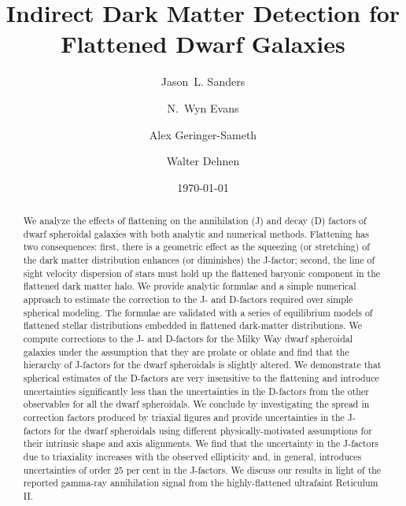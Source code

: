 \documentclass[prd,twocolumn,showpacs,preprintnumbers,superscriptaddress,nofootinbib,amsmath,amssymb,nobalancelastpage]{revtex4}
\def\percent{\text{ per cent}}
\def\percent{\text{ per cent}}
\begin{document}
\title{Indirect Dark Matter Detection for Flattened Dwarf Galaxies}

\author{Jason~L. Sanders}

\author{N.~Wyn Evans}

\author{Alex Geringer-Sameth}

\author{Walter Dehnen}

\date{\today}

\begin{abstract}
We analyze the effects of flattening on the annihilation (J) and decay (D) factors of dwarf spheroidal galaxies with both analytic
and numerical methods. Flattening has two consequences: first, there
is a geometric effect as the squeezing (or stretching) of the dark
matter distribution enhances (or diminishes) the J-factor; second, the
line of sight velocity dispersion of stars must hold up the flattened baryonic
component in the flattened dark matter halo. We provide analytic formulae and a simple numerical approach to estimate the correction to the J- and D-factors required over simple spherical modeling. The formulae are validated with a series of equilibrium models of flattened stellar distributions embedded in flattened dark-matter distributions.
We compute corrections to the J- and D-factors for the Milky Way dwarf spheroidal galaxies under the assumption that they are prolate or oblate and find that the hierarchy of J-factors for the dwarf spheroidals is slightly altered. We demonstrate that spherical estimates of the D-factors are very insensitive to the flattening and introduce uncertainties significantly less than the uncertainties in the D-factors from the other observables for all the dwarf spheroidals. We conclude by investigating the spread in correction factors produced by triaxial figures and provide uncertainties in the J-factors for the dwarf spheroidals using different physically-motivated assumptions for their intrinsic shape and axis alignments. We find that the uncertainty in the J-factors due to triaxiality increases with the observed ellipticity and, in general, introduces uncertainties of order $25\percent$ in the J-factors. We discuss our results in light of the reported gamma-ray annihilation signal from the highly-flattened ultrafaint Reticulum II.
\end{abstract}
\end{document}
